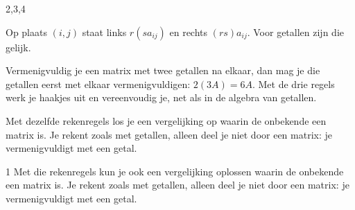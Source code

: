 \begin{alleenvoor}{2,3,4}
\begin{theorie}
\begin{bewijs}
Op plaats $(i, j)$ staat links $r(sa_{ij})$ en rechts $(rs)a_{ij}$. Voor getallen zijn die gelijk.
\end{bewijs}
\end{theorie}

Vermenigvuldig je een matrix met twee getallen na elkaar, dan mag je die getallen eerst met elkaar vermenigvuldigen: $2(3A) = 6A$. Met de drie regels werk je haakjes uit en vereenvoudig je, net als in de algebra van getallen.


\begin{oefeningen}
\end{oefeningen}

Met dezelfde rekenregels los je een vergelijking op waarin de onbekende een matrix is. Je rekent zoals met getallen, alleen deel je niet door een matrix: je vermenigvuldigt met een getal.
\end{alleenvoor}
\begin{alleenvoor}{1}
Met die rekenregels kun je ook een vergelijking oplossen waarin de onbekende een matrix is. Je rekent zoals met getallen, alleen deel je niet door een matrix: je vermenigvuldigt met een getal.
\end{alleenvoor}

